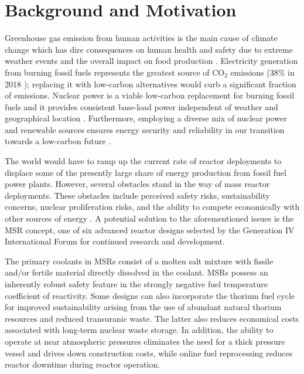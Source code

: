 \section{Background and Motivation}

Greenhouse gas emission from human activities is the main cause of climate
change which has dire
consequences on human health and safety due to extreme weather events and the
overall impact on food production \cite{mcmichael_global_2004}.
Electricity generation from burning fossil fuels represents the
greatest source of CO$_2$ emissions (38\% in 2018 \cite{iea_global_2019});
replacing it with low-carbon
alternatives would curb a significant fraction of emissions. Nuclear power is
a viable low-carbon replacement for burning fossil fuels and it provides
consistent base-load power independent of weather and geographical location
\cite{petti_future_2018}. Furthermore, employing a diverse mix of nuclear
power and renewable sources ensures energy security and reliability in our
transition towards a low-carbon future \cite{petti_future_2018}.

The world would have to ramp up the current rate of reactor deployments to
displace some of the presently large share of energy production from fossil
fuel power plants. However, several obstacles stand in the way of mass reactor
deployments. These obstacles include perceived safety risks, sustainability
concerns, nuclear proliferation
risks, and the ability to compete economically with other sources of energy
\cite{massachusetts_institute_of_technology_future_2003}. A potential solution
to the aforementioned issues is the \gls{MSR} concept, one of six advanced
reactor designs selected by the Generation IV International Forum
\cite{gif_technology_2002} for continued research and development.

The primary coolants in MSRs consist of a molten salt mixture
with fissile and/or fertile material directly dissolved in the coolant.
MSRs possess an inherently robust safety feature in the strongly negative fuel
temperature coefficient of reactivity. Some designs can also incorporate the
thorium fuel cycle for improved sustainability arising from the use of
abundant natural thorium resources and reduced transuranic waste. The
latter also reduces economical costs
associated with long-term nuclear waste storage. In addition, the ability to
operate at near atmospheric pressures eliminates the need for a thick pressure
vessel and drives down construction costs, while online fuel reprocessing
reduces reactor downtime during reactor operation.

